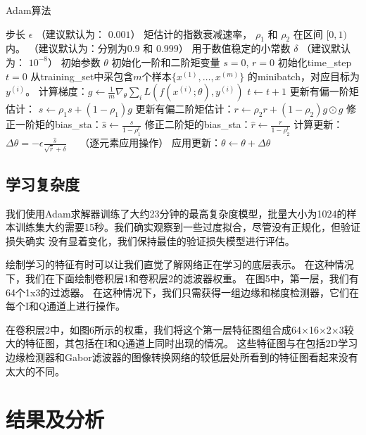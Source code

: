 \begin{algorithm}[ht]
	\caption{Adam算法}
	\label{alg:adam}
	\begin{algorithmic}
		\REQUIRE 步长 $\epsilon$ （建议默认为： $0.001$）
		\REQUIRE 矩估计的指数衰减速率， $\rho_1$ 和 $\rho_2$ 在区间 $[0, 1)$内。
		（建议默认为：分别为$0.9$ 和 $0.999$）
		\REQUIRE 用于数值稳定的小常数 $\delta$  （建议默认为： $10^{-8}$）
		\REQUIRE 初始参数 $\theta$
		\STATE 初始化一阶和二阶矩变量 $s = 0 $, $r = 0$
		\STATE 初始化\gls{time_step} $t=0$ 
		\STATE 从\gls{training_set}中采包含$m$个样本$\{ x^{(1)},\dots, x^{(m)}\}$ 的\gls{minibatch}，对应目标为$y^{(i)}$。
		\STATE 计算梯度：$g \leftarrow \frac{1}{m} \nabla_{\theta} \sum_i L(f(x^{(i)};\theta),y^{(i)})$ 
		\STATE $t \leftarrow t + 1$
		\STATE 更新有偏一阶矩估计： $s \leftarrow \rho_1 s + (1-\rho_1) g$
		\STATE 更新有偏二阶矩估计：$r \leftarrow \rho_2 r + (1-\rho_2)  g \odot g$
		\STATE 修正一阶矩的\gls{bias_sta}：$\hat{s} \leftarrow \frac{s}{1-\rho_1^t}$
		\STATE 修正二阶矩的\gls{bias_sta}：$\hat{r} \leftarrow \frac{r}{1-\rho_2^t}$
		\STATE 计算更新：$\Delta \theta = - \epsilon \frac{\hat{s}}{\sqrt{\hat{r}} + \delta}$ \ \  （逐元素应用操作）
		\STATE 应用更新：$\theta \leftarrow \theta + \Delta \theta$
		\ENDWHILE
	\end{algorithmic}
\end{algorithm}

\subsection{学习复杂度}
我们使用Adam求解器训练了大约23分钟的最高复杂度模型，批量大小为1024的样本训练集大约需要15秒。我们确实观察到一些过度拟合，尽管没有正规化，但验证损失确实 没有显着变化，我们保持最佳的验证损失模型进行评估。\par

绘制学习的特征有时可以让我们直觉了解网络正在学习的底层表示。 在这种情况下，我们在下面绘制卷积层1和卷积层2的滤波器权重。 在图5中，第一层，我们有64个1x3的过滤器。 在这种情况下，我们只需获得一组边缘和梯度检测器，它们在每个I和Q通道上进行操作。\par

在卷积层2中，如图6所示的权重，我们将这个第一层特征图组合成64×16×2×3较大的特征图，其包括在I和Q通道上同时出现的情况。 这些特征图与在包括2D学习边缘检测器和Gabor滤波器的图像转换网络的较低层处所看到的特征图看起来没有太大的不同。\par


\section{结果及分析}


